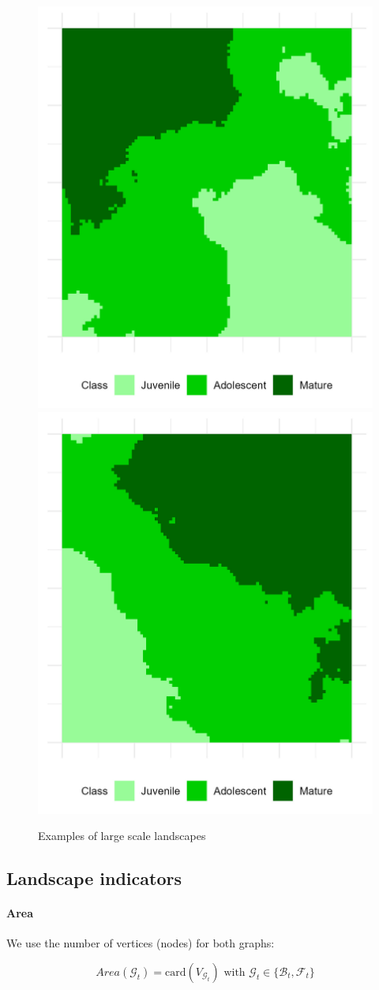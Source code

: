 \begin{figure}[H]
    \includegraphics[width=0.4\linewidth]{figures/wildland/large_land_autocorr_1.8_distrib_1}
    \includegraphics[width=0.4\linewidth]{figures/wildland/large_land_autocorr_1.8_distrib_4}
    \caption{Examples of large scale landscapes}
    \label{fig:ex_nlm}
\end{figure}
\clearpage





\subsection{Landscape indicators}
\label{sec:appendix_wildland__indicators}

\paragraph{Area}
We use the number of vertices (nodes) for both graphs:

\begin{equation}
Area(\mathcal{G}_t) = \mathrm{card}(V_{\mathcal{G}_t}) \text{ with } \mathcal{G}_t\in\{\mathcal{B}_t,\mathcal{F}_t\}
\label{eq:area}
\end{equation}

